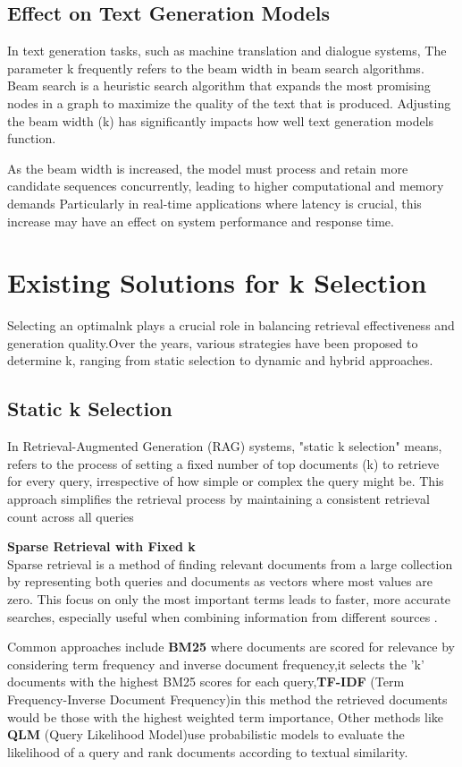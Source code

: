 \subsection {Effect on Text Generation Models}
In text generation tasks, such as machine translation and dialogue systems, The parameter k frequently refers to the beam width in beam search algorithms\cite{freitag-al-onaizan-2017-beam}. Beam search is a heuristic search algorithm that expands the most promising nodes in a graph to maximize the quality of the text that is produced. Adjusting the beam width (k) has significantly impacts how well text generation models function.

As the beam width is increased, the model must process and retain more candidate sequences concurrently, leading to higher computational and memory demands Particularly in real-time applications where latency is crucial, this increase may have an effect on system performance and response time\cite{tensorrt_llm_beam_search}.

\section{Existing Solutions for k Selection}
Selecting an optimalnk plays a crucial role in balancing retrieval effectiveness and generation quality.Over the years, various strategies have been proposed to determine k, ranging from static selection to dynamic and hybrid approaches.
\subsection{Static k Selection}
In Retrieval-Augmented Generation (RAG) systems, "static k selection" means, refers to the process of setting a fixed number of top documents (k) to retrieve for every query, irrespective of how simple or complex the query might be. This approach simplifies the retrieval process by maintaining a consistent retrieval count across all queries

\textbf{ Sparse Retrieval with Fixed k} \\
Sparse retrieval is a method of finding relevant documents from a large collection by representing both queries and documents as vectors where most values are zero. This focus on only the most important terms leads to faster, more accurate searches, especially useful when combining information from different sources \cite{zheng2024enhancing}.

Common approaches include \textbf{BM25}\cite{10.1561/1500000019} where documents are scored for relevance by considering term frequency and inverse document frequency,it selects the 'k' documents with the highest BM25 scores for each query,\textbf{TF-IDF} (Term Frequency-Inverse Document Frequency)\cite{gfg2025tfidf}in this method the retrieved documents would be those with the highest weighted term importance, Other methods like \textbf{QLM }(Query Likelihood Model)\cite{10.1007/978-3-030-72240-1_49}use probabilistic models to evaluate the likelihood of a query and rank documents according to textual similarity.

